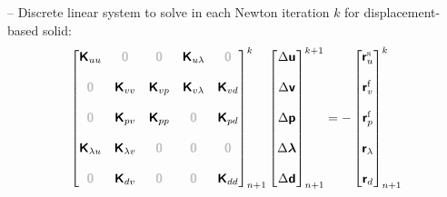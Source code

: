 \documentclass[a4paper,12pt]{report}
\newcommand{\bs}[1]{\boldsymbol{#1}}
\newcommand{\zerom}{\textcolor{lightgray}{\bs{\mathsf{0}}}}
\newcommand{\ROP}{\bs{\mathsf{r}}}
\newcommand{\LM}{\bs{\mathsf{\lambda}}}
\newcommand{\lmi}{\lambda} %
\begin{document}
-- Discrete linear system to solve in each Newton iteration $k$ for displacement-based solid:
\begin{equation}
\label{equation-lin-sys-fsi}
\begin{aligned}
\begin{bmatrix} \bs{\mathsf{K}}_{uu} & \zerom & \zerom & \bs{\mathsf{K}}_{u\lmi} & \zerom \\ \\ \zerom & \bs{\mathsf{K}}_{vv} & \bs{\mathsf{K}}_{vp} & \bs{\mathsf{K}}_{v\lmi} & \bs{\mathsf{K}}_{vd} \\ \\ \zerom & \bs{\mathsf{K}}_{pv} & \bs{\mathsf{K}}_{pp} & \zerom & \bs{\mathsf{K}}_{pd} \\ \\ \bs{\mathsf{K}}_{\lmi u} & \bs{\mathsf{K}}_{\lmi v} & \zerom & \zerom & \zerom \\ \\ \zerom &  \bs{\mathsf{K}}_{dv}  & \zerom & \zerom & \bs{\mathsf{K}}_{dd} \end{bmatrix}_{n+1}^{k}\begin{bmatrix} \Delta\bs{\mathsf{u}} \\ \\ \Delta\bs{\mathsf{v}} \\ \\ \Delta\bs{\mathsf{p}} \\ \\ \Delta\LM \\ \\ \Delta\bs{\mathsf{d}} \end{bmatrix}_{n+1}^{k+1}=-\begin{bmatrix} \ROP_{u}^{\mathrm{s}} \\ \\ \ROP_{v}^{\mathrm{f}} \\ \\ \ROP_{p}^{\mathrm{f}} \\ \\ \ROP_{\lmi} \\ \\ \ROP_{d}\end{bmatrix}_{n+1}^{k}
\end{aligned}
\end{equation}
\end{document}
